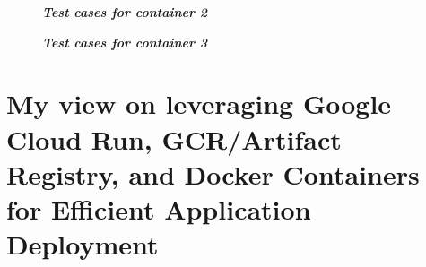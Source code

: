\begin{figure}[htp]
    \centering
    \caption{\textbf{\textit{Test cases for container 2}}}
    \label{fig:test-case-container-2}
\end{figure}

\begin{figure}[htp]
    \centering
    \caption{\textbf{\textit{Test cases for container 3}}}
    \label{fig:test-case-container-3}
\end{figure}

\newpage
\section{My view on leveraging Google Cloud Run, GCR/Artifact Registry, and Docker Containers for Efficient Application Deployment}

